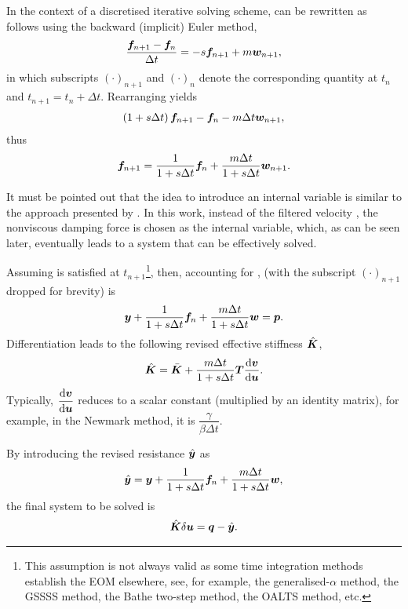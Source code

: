 In the context of a discretised iterative solving scheme,  can be rewritten as follows using the backward (implicit) Euler method,
\begin{gather}\label{eq:discretised_a}
\dfrac{\bm{f}_{n+1}-\bm{f}_n}{\Delta{}t}=-s\bm{f}_{n+1}+m\bm{w}_{n+1},
\end{gather}
in which subscripts $\left(\cdot\right)_{n+1}$ and $\left(\cdot\right)_n$ denote the corresponding quantity at $t_n$ and $t_{n+1}=t_n+\Delta{}t$.
Rearranging  yields
\begin{gather}\label{eq:discretised_b}
\left(1+s\Delta{}t\right)\bm{f}_{n+1}-\bm{f}_n-m\Delta{}t\bm{w}_{n+1},
\end{gather}
thus
\begin{gather}\label{eq:discretised_c}
\bm{f}_{n+1}=\dfrac{1}{1+s\Delta{}t}\bm{f}_n+\dfrac{m\Delta{}t}{1+s\Delta{}t}\bm{w}_{n+1}.
\end{gather}

It must be pointed out that the idea to introduce an internal variable is similar to the approach presented by \citet[][see \S~4.3]{Adhikari2014}. In this work, instead of the filtered velocity \citep[][see Eq. 4.23]{Adhikari2014}, the nonviscous damping force is chosen as the internal variable, which, as can be seen later, eventually leads to a system that can be effectively solved.

Assuming  is satisfied at $t_{n+1}$\footnote{This assumption is not always valid as some time integration methods establish the EOM elsewhere, see, for example, the generalised-$\alpha$ method, the GSSSS method, the Bathe two-step method, the OALTS method, etc.}, then, accounting for ,  (with the subscript $\left(\cdot\right)_{n+1}$ dropped for brevity) is
\begin{gather}\label{eq:residual}
\bm{y}+\dfrac{1}{1+s\Delta{}t}\bm{f}_n+\dfrac{m\Delta{}t}{1+s\Delta{}t}\bm{w}=\bm{p}.
\end{gather}
Differentiation leads to the following revised effective stiffness $\hat{\bm{K}}$,
\begin{gather}\label{eq:revised_k}
\hat{\bm{K}}=\bar{\bm{K}}+\dfrac{m\Delta{}t}{1+s\Delta{}t}\bm{T}\dfrac{\mathrm{d}\bm{v}}{\mathrm{d}\bm{u}}.
\end{gather}
Typically, $\dfrac{\mathrm{d}\bm{v}}{\mathrm{d}\bm{u}}$ reduces to a scalar constant (multiplied by an identity matrix), for example, in the Newmark method, it is $\dfrac{\gamma}{\beta\Delta{}t}$.

By introducing the revised resistance $\hat{\bm{y}}$ as
\begin{gather}\label{eq:revised_y}
\hat{\bm{y}}=\bm{y}+\dfrac{1}{1+s\Delta{}t}\bm{f}_n+\dfrac{m\Delta{}t}{1+s\Delta{}t}\bm{w},
\end{gather}
the final system to be solved is
\begin{gather}\label{eq:revised_system}
\hat{\bm{K}}\delta\bm{u}=\bm{q}-\hat{\bm{y}}.
\end{gather}

